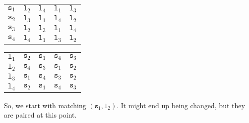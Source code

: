 \documentclass[a4paper, openany]{memoir}
\begin{document}
    \begin{table}[H]
        \centering
        \begin{subtable}{0.45\textwidth}
            \centering
            \begin{tabular}{c|cccc}
                $\texttt{s}_1$ & \underline{$\texttt{l}_2$} & $\texttt{l}_4$ & $\texttt{l}_1$ & $\texttt{l}_3$ \\
                $\texttt{s}_2$ & $\texttt{l}_3$ & $\texttt{l}_1$ & $\texttt{l}_4$ & $\texttt{l}_2$ \\
                $\texttt{s}_3$ & $\texttt{l}_2$ & $\texttt{l}_3$ & $\texttt{l}_1$ & $\texttt{l}_4$ \\
                $\texttt{s}_4$ & $\texttt{l}_4$ & $\texttt{l}_1$ & $\texttt{l}_3$ & $\texttt{l}_2$
            \end{tabular}
        \end{subtable}
        \hfill
        \begin{subtable}{0.45\textwidth}
            \centering
            \begin{tabular}{c|cccc}
                $\texttt{l}_1$ & $\texttt{s}_2$ & $\texttt{s}_1$ & $\texttt{s}_4$ & $\texttt{s}_3$ \\
                $\texttt{l}_2$ & $\texttt{s}_4$ & $\texttt{s}_3$ & \underline{$\texttt{s}_1$} & $\texttt{s}_2$ \\
                $\texttt{l}_3$ & $\texttt{s}_1$ & $\texttt{s}_4$ & $\texttt{s}_3$ & $\texttt{s}_2$ \\
                $\texttt{l}_4$ & $\texttt{s}_2$ & $\texttt{s}_1$ & $\texttt{s}_4$ & $\texttt{s}_3$
            \end{tabular}
        \end{subtable}
    \end{table}
    \noindent So, we start with matching $(\texttt{s}_1, \texttt{l}_2)$. It might end up being changed, but they are paired at this point. 
\end{document}
